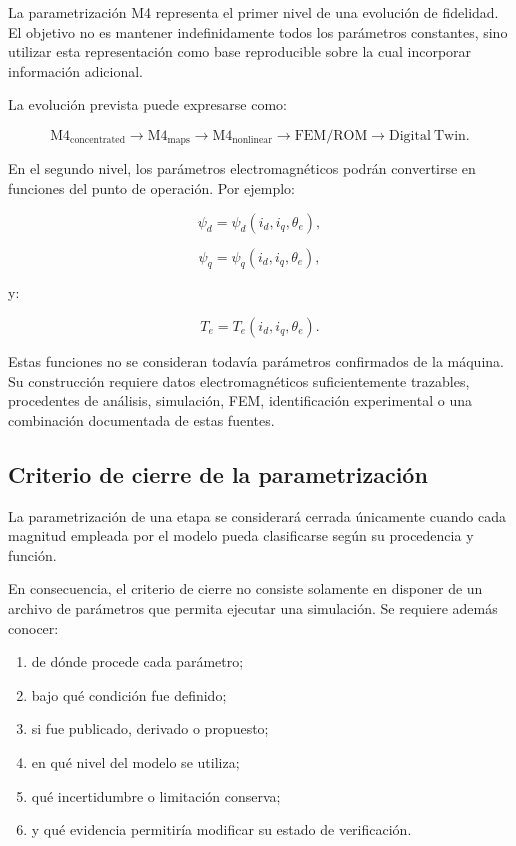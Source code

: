 La parametrización M4 representa el primer nivel de una evolución de fidelidad. El objetivo no es mantener indefinidamente todos los parámetros constantes, sino utilizar esta representación como base reproducible sobre la cual incorporar información adicional.

La evolución prevista puede expresarse como:

\begin{equation}
\mathrm{M4}_{\mathrm{concentrated}}
\rightarrow
\mathrm{M4}_{\mathrm{maps}}
\rightarrow
\mathrm{M4}_{\mathrm{nonlinear}}
\rightarrow
\mathrm{FEM/ROM}
\rightarrow
\mathrm{Digital\ Twin}.
\end{equation}

En el segundo nivel, los parámetros electromagnéticos podrán convertirse en funciones del punto de operación. Por ejemplo:

\begin{equation}
\psi_d=\psi_d(i_d,i_q,\theta_e),
\end{equation}

\begin{equation}
\psi_q=\psi_q(i_d,i_q,\theta_e),
\end{equation}

y:

\begin{equation}
T_e=T_e(i_d,i_q,\theta_e).
\end{equation}

Estas funciones no se consideran todavía parámetros confirmados de la máquina. Su construcción requiere datos electromagnéticos suficientemente trazables, procedentes de análisis, simulación, FEM, identificación experimental o una combinación documentada de estas fuentes.

\subsection{Criterio de cierre de la parametrización}

La parametrización de una etapa se considerará cerrada únicamente cuando cada magnitud empleada por el modelo pueda clasificarse según su procedencia y función.

En consecuencia, el criterio de cierre no consiste solamente en disponer de un archivo de parámetros que permita ejecutar una simulación. Se requiere además conocer:

\begin{enumerate}
    \item de dónde procede cada parámetro;
    \item bajo qué condición fue definido;
    \item si fue publicado, derivado o propuesto;
    \item en qué nivel del modelo se utiliza;
    \item qué incertidumbre o limitación conserva;
    \item y qué evidencia permitiría modificar su estado de verificación.
\end{enumerate}

